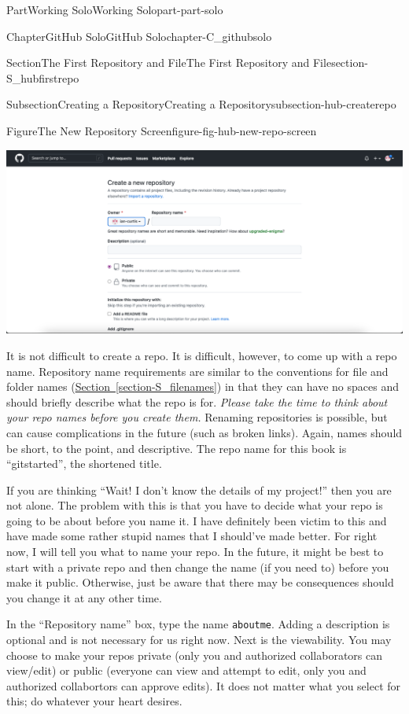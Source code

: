 \documentclass[oneside,10pt,]{book}
\newcommand{\xreffont}{\relax}
\newcommand{\mono}[1]{\texttt{#1}}
\begin{document}
\begin{partptx}{Part}{Working Solo}{}{Working Solo}{}{}{part-part-solo}
\begin{chapterptx}{Chapter}{GitHub Solo}{}{GitHub Solo}{}{}{chapter-C_githubsolo}
\begin{sectionptx}{Section}{The First Repository and File}{}{The First Repository and File}{}{}{section-S_hubfirstrepo}
\begin{subsectionptx}{Subsection}{Creating a Repository}{}{Creating a Repository}{}{}{subsection-hub-createrepo}
\begin{figureptx}{Figure}{The New Repository Screen}{figure-fig-hub-new-repo-screen}{}
\begin{image}{0.05}{0.9}{0.05}{}
\includegraphics[width=\linewidth]{external/hub_new_repo_screen.pdf}
\end{image}%
\tcblower
\end{figureptx}%
It is not difficult to create a repo. It is difficult, however, to come up with a repo name. Repository name requirements are similar to the conventions for file and folder names (\hyperref[section-S_filenames]{Section~{\xreffont\ref{section-S_filenames}}}) in that they can have no spaces and should briefly describe what the repo is for. \emph{Please take the time to think about your repo names before you create them.} Renaming repositories is possible, but can cause complications in the future (such as broken links). Again, names should be short, to the point, and descriptive. The repo name for this book is ``gitstarted'', the shortened title.%
\par
If you are thinking ``Wait! I don't know the details of my project!'' then you are not alone. The problem with this is that you have to decide what your repo is going to be about before you name it. I have definitely been victim to this and have made some rather stupid names that I should've made better. For right now, I will tell you what to name your repo. In the future, it might be best to start with a private repo and then change the name (if you need to) before you make it public. Otherwise, just be aware that there may be consequences should you change it at any other time.%
\par
In the ``Repository name'' box, type the name \mono{aboutme}. Adding a description is optional and is not necessary for us right now. Next is the viewability. You may choose to make your repos private (only you and authorized collaborators can view\slash{}edit) or public (everyone can view and attempt to edit, only you and authorized collabortors can approve edits). It does not matter what you select for this; do whatever your heart desires.%
\par

\end{subsectionptx}
\end{sectionptx}
\end{chapterptx}
\end{partptx}
\end{document}
